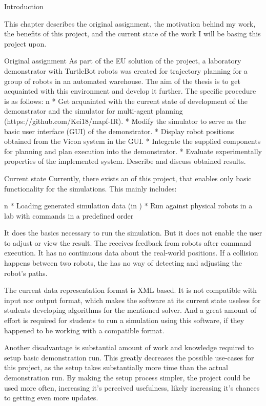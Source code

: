 \chap Introduction

This chapter describes the original assignment, the motivation behind my work, the benefits of this project, and the current state of the work I will be basing this project upon.

\sec Original assignment
As part of the EU solution of the {\safeLog} project, a laboratory demonstrator with TurtleBot robots was created for trajectory planning for a group of robots in an automated warehouse. The aim of the thesis is to get acquainted with this environment and develop it further. The specific procedure is as follows:
\begitems \style n
    * Get acquainted with the current state of development of the demonstrator and the simulator for multi-agent planning (https://github.com/Kei18/mapf-IR).
    * Modify the simulator to serve as the basic user interface (GUI) of the demonstrator.
    * Display robot positions obtained from the Vicon system in the GUI.
    * Integrate the supplied components for planning and plan execution into the demonstrator.
    * Evaluate experimentally properties of the implemented system. Describe and discuss obtained results.
\enditems

\sec Current state
Currently, there exists an {\oldRepo} of this project, that enables only basic functionality for the simulations. This mainly includes:

\begitems \style n
    * Loading generated simulation data (in {\oldFormat})
    * Run against physical robots in a lab with commands in a predefined order
\enditems

It does the basics necessary to run the simulation. But it does not enable the user to adjust or view the result. The {\oldRepo} receives feedback from robots after command execution. It has no continuous data about the real-world positions. If a collision happens between two robots, the {\oldRepo} has no way of detecting and adjusting the robot's paths.

The current data representation format is XML based. It is not compatible with {\mapfIR} input nor output format, which makes the software at its current state useless for students developing algorithms for the \mapfIR mentioned solver. And a great amount of effort is required for students to run a simulation using this software, if they happened to be working with a compatible format.

Another disadvantage is substantial amount of work and knowledge required to setup basic demonstration run. This greatly decreases the possible use-cases for this project, as the setup takes substantially more time than the actual demonstration run. By making the setup process simpler, the project could be used more often, increasing it's perceived usefulness, likely increasing it's chances to getting even more updates.

